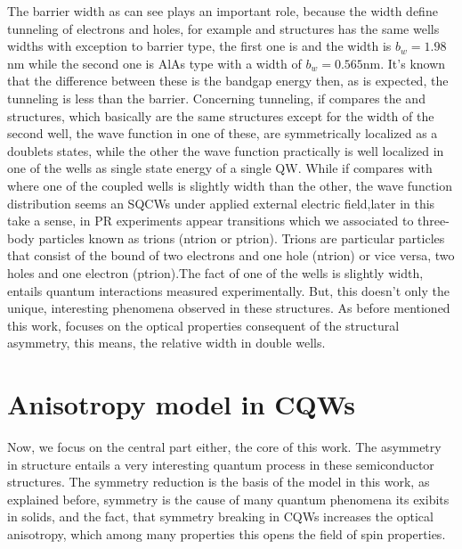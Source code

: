 The barrier width as can see plays an important role, because the width define tunneling of electrons and holes, for example  and   structures has the same wells widths with exception to barrier type, the first one is  and the width is $b_{w}=1.98$nm while the second one is AlAs type with a width of $b_{w}=0.565$nm. It's known that the difference between these is the bandgap energy then, as is expected, the tunneling is less than the   barrier. Concerning tunneling, if compares the  and  structures, which basically are the same structures except for the width of the second well, the wave function in one of these,  are symmetrically localized as a doublets states, while the other the wave function practically is well localized in one of the wells as single state energy of a single QW\cite{sivalertporn2016effectofbarrier}. While if compares with  where one of the coupled wells is slightly  width than the other, the wave function distribution seems an SQCWs under applied external electric field\cite{sivalertporn2012direct},later in  this take a sense, in \gls{PR} experiments appear transitions which we associated to three-body particles known as trions (\gls{ntrion} or \gls{ptrion}). Trions are particular particles that consist of the bound of two electrons and one hole (\gls{ntrion}) or vice versa, two holes and one electron (\gls{ptrion}).The fact of one of the wells is slightly width, entails quantum interactions measured experimentally. But, this doesn't only the unique, interesting phenomena observed in these structures. As before mentioned this work, focuses on the optical properties consequent of the structural asymmetry, this means, the relative width in double wells. 
\section{Anisotropy model in CQWs \label{sub:chap2-anisotropy-model}}
\label{subsec:chapter-2-anisotropy-model}
\vspace{-10mm} 
Now, we focus on the central part either, the core of this work. The asymmetry in structure entails a very interesting quantum process in these semiconductor structures. The symmetry reduction is the basis of the model in this work, as explained before, symmetry is the cause of many quantum phenomena its exibits in solids, and the fact, that symmetry breaking in CQWs increases the optical anisotropy, which among many properties this opens the field of spin properties\cite{sivalertporn2012direct,averkiev2006spin,kotova2016optical,schonhuber2014inelastic,tronc2012spin}.


